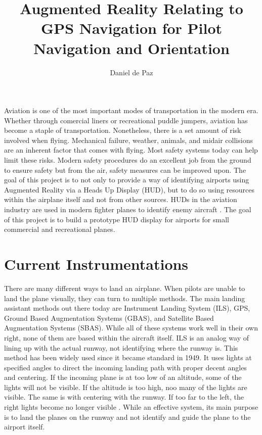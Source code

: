 \documentclass[journal]{vgtc}                %
\title{Augmented Reality Relating to GPS Navigation for Pilot Navigation and Orientation}
\author{
  Daniel de Paz}
\begin{document}

\maketitle

Aviation is one of the most important modes of transportation in the modern era. Whether through comercial liners or recreational puddle jumpers, aviation has become a staple of transportation. Nonetheless, there is a set amount of risk involved when flying. Mechanical failure, weather, animals, and midair collisions are an inherent factor that comes with flying. Most safety systems today can help limit these risks. Modern safety procedures do an excellent job from the ground to ensure safety but from the air, safety measures can be improved upon. The goal of this project is to not only to provide a way of identifying airports using Augmented Reality via a Heads Up Display (HUD), but to do so using resources within the airplane itself and not from other sources. HUDs in the aviation industry are used in modern fighter planes to identify enemy aircraft \cite{964244}. The goal of this project is to build a prototype HUD display for airports for small commercial and recreational planes.

\section{Current Instrumentations}

There are many different ways to land an airplane. When pilots are unable to land the plane visually, they can turn to multiple methods. The main landing assistant methods out there today are Instrument Landing System (ILS), GPS, Ground Based Augmentation Systems (GBAS), and Satellite Based Augmentation Systems (SBAS). While all of these systems work well in their own right, none of them are based within the aircraft itself. ILS is an analog way of lining up with the actual runway, not identifying where the runway is. This method has been widely used since it became standard in 1949. It uses lights at specified angles to direct the incoming landing path with proper decent angles and centering. If the incoming plane is at too low of an altitude, some of the lights will not be visible. If the altitude is too high, noo many of the lights are visible. The same is with centering with the runway. If too far to the left, the right lights become no longer visible \cite{8769357, 4586415, 8973154, 4068739}. While an effective system, its main purpose is to land the planes on the runway and not identify and guide the plane to the airport itself. 
\end{document}
